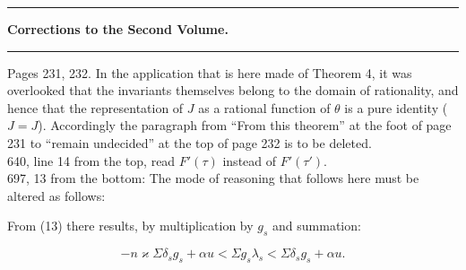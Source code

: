 \begin{center}
\rule{3cm}{0.4pt}
\end{center}

\begin{center}
\textbf{Corrections to the Second Volume.}
\end{center}

\begin{center}
\rule{3cm}{0.4pt}
\end{center}

\bigskip
\noindent Pages 231, 232. In the application that is here made of Theorem 4,
it was overlooked that the invariants themselves belong to the domain of
 rationality, and hence that the representation of $J$ as a rational
function of $\theta$ is a pure identity ($J = J$). Accordingly
the paragraph from ``From this theorem'' at the foot of page 231 to ``remain
undecided'' at the top of page 232 is to be deleted.\\
\glqq{} 640, line 14 from the top, read $F'(\tau)$ instead of $F'(\tau')$.\\
\glqq{} 697, \glqq{} 13 from the bottom: The mode of reasoning that follows here must be
altered as follows:

\bigskip
\noindent From (13) there results, by multiplication by $g_s$ and summation:

\[
-n\varkappa \Sigma \delta_s g_s + \alpha u < \Sigma g_s \lambda_s < \Sigma \delta_s g_s + \alpha u.
\]
